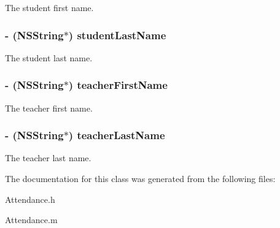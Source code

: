 \-The student first name. \hypertarget{interface_attendance_a0750a37e87bdcd6e188846b174faf211}{
\subsubsection[{student\-Last\-Name}]{\setlength{\rightskip}{0pt plus 5cm}-\/ (\-N\-S\-String$\ast$) {\bf student\-Last\-Name}}}\label{interface_attendance_a0750a37e87bdcd6e188846b174faf211}
\-The student last name. \hypertarget{interface_attendance_aa8205f78bffac5fd2dd3ce2a44ef1e96}{
\subsubsection[{teacher\-First\-Name}]{\setlength{\rightskip}{0pt plus 5cm}-\/ (\-N\-S\-String$\ast$) {\bf teacher\-First\-Name}}}\label{interface_attendance_aa8205f78bffac5fd2dd3ce2a44ef1e96}
\-The teacher first name. \hypertarget{interface_attendance_ad532e084c8758266e0106649e4f5605e}{
\subsubsection[{teacher\-Last\-Name}]{\setlength{\rightskip}{0pt plus 5cm}-\/ (\-N\-S\-String$\ast$) {\bf teacher\-Last\-Name}}}\label{interface_attendance_ad532e084c8758266e0106649e4f5605e}
\-The teacher last name. 

\-The documentation for this class was generated from the following files\-:\begin{DoxyCompactItemize}
\item 
\-Attendance.\-h\item 
\-Attendance.\-m\end{DoxyCompactItemize}
